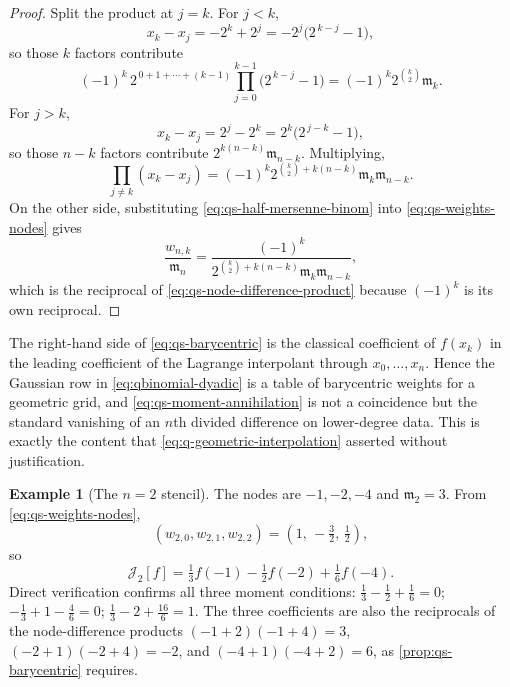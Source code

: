 \documentclass[11pt,oneside]{article}
\theoremstyle{definition}
\newtheorem{example}[theorem]{Example}
\theoremstyle{remark}
\begin{document}
\begin{proof}
Split the product at $j=k$.  For $j<k$,
\begin{equation*}
 x_k-x_j=-2^k+2^j=-2^j\bigl(2^{\,k-j}-1\bigr),
\end{equation*}
so those $k$ factors contribute
\begin{equation*}
 (-1)^k\,2^{\,0+1+\cdots+(k-1)}\prod_{j=0}^{k-1}\bigl(2^{\,k-j}-1\bigr)
 =(-1)^k2^{\binom k2}\mathfrak m_k.
\end{equation*}
For $j>k$,
\begin{equation*}
 x_k-x_j=2^j-2^k=2^k\bigl(2^{\,j-k}-1\bigr),
\end{equation*}
so those $n-k$ factors contribute $2^{k(n-k)}\mathfrak m_{n-k}$.  Multiplying,
\begin{equation}
 \prod_{j\ne k}(x_k-x_j)
 =(-1)^k2^{\binom k2+k(n-k)}\mathfrak m_k\mathfrak m_{n-k}. \label{eq:qs-node-difference-product}
\end{equation}
On the other side, substituting \eqref{eq:qs-half-mersenne-binom} into
\eqref{eq:qs-weights-nodes} gives
\begin{equation*}
 \frac{w_{n,k}}{\mathfrak m_n}
 =\frac{(-1)^k}{2^{\binom k2+k(n-k)}\mathfrak m_k\mathfrak m_{n-k}},
\end{equation*}
which is the reciprocal of \eqref{eq:qs-node-difference-product} because $(-1)^k$ is its own
reciprocal.
\end{proof}

The right-hand side of \eqref{eq:qs-barycentric} is the classical coefficient of $f(x_k)$ in
the leading coefficient of the Lagrange interpolant through $x_0,\ldots,x_n$.  Hence the
Gaussian row in \eqref{eq:qbinomial-dyadic} is a table of barycentric weights for a geometric
grid, and \eqref{eq:qs-moment-annihilation} is not a coincidence but the standard vanishing
of an $n$th divided difference on lower-degree data.  This is exactly the content that
\eqref{eq:q-geometric-interpolation} asserted without justification.

\begin{example}[The $n=2$ stencil]
\label{ex:qs-n2-stencil}
The nodes are $-1,-2,-4$ and $\mathfrak m_2=3$.  From \eqref{eq:qs-weights-nodes},
\begin{equation*}
 (w_{2,0},w_{2,1},w_{2,2})=\left(1,\,-\tfrac32,\,\tfrac12\right),
\end{equation*}
so
\begin{equation*}
 \mathcal J_2[f]=\tfrac13f(-1)-\tfrac12f(-2)+\tfrac16f(-4).
\end{equation*}
Direct verification confirms all three moment conditions:
$\tfrac13-\tfrac12+\tfrac16=0$;
$-\tfrac13+1-\tfrac46=0$;
$\tfrac13-2+\tfrac{16}6=1$.
The three coefficients are also the reciprocals of the node-difference products
$(-1+2)(-1+4)=3$, $(-2+1)(-2+4)=-2$, and $(-4+1)(-4+2)=6$, as
\cref{prop:qs-barycentric} requires.
\end{example}
\end{document}
